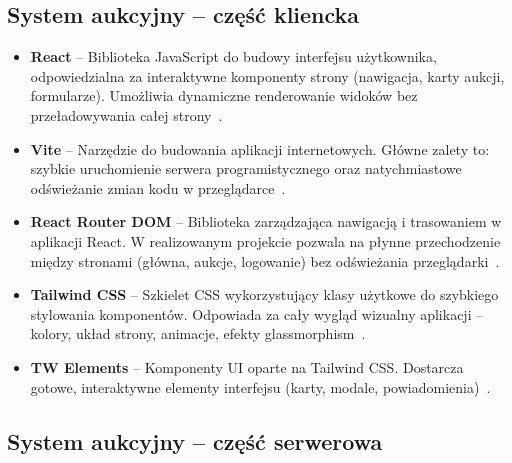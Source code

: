 \subsection{System aukcyjny -- część kliencka}

\begin{itemize}
  \item \textbf{React} -- Biblioteka JavaScript do budowy interfejsu użytkownika, odpowiedzialna za interaktywne komponenty strony (nawigacja, karty aukcji, formularze). Umożliwia dynamiczne renderowanie widoków bez przeładowywania całej strony~\cite{react}.
  \item \textbf{Vite} -- Narzędzie do budowania aplikacji internetowych. Główne zalety to: szybkie uruchomienie serwera programistycznego oraz natychmiastowe odświeżanie zmian kodu w przeglądarce~\cite{vite}.
  \item \textbf{React Router DOM} -- Biblioteka zarządzająca nawigacją i trasowaniem w aplikacji React. W realizowanym projekcie pozwala na płynne przechodzenie między stronami (główna, aukcje, logowanie) bez odświeżania przeglądarki~\cite{react-router}.
  \item \textbf{Tailwind CSS} -- Szkielet CSS wykorzystujący klasy użytkowe do szybkiego stylowania komponentów. Odpowiada za cały wygląd wizualny aplikacji -- kolory, układ strony, animacje, efekty glassmorphism~\cite{tailwindcss}.
  \item \textbf{TW Elements} -- Komponenty UI oparte na Tailwind CSS. Dostarcza gotowe, interaktywne elementy interfejsu (karty, modale, powiadomienia)~\cite{tw-elements}.
\end{itemize}

\subsection{System aukcyjny -- część serwerowa}

